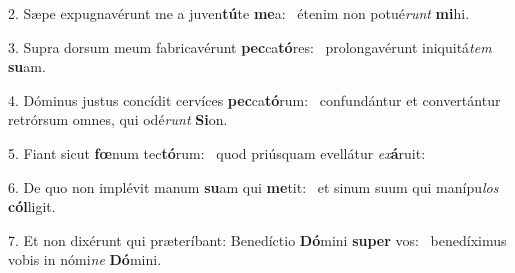 2. Sæpe expugnavérunt me a juven\textbf{tú}te \textbf{me}a: \ast\  étenim non potué\textit{runt} \textbf{mi}hi.\

3. Supra dorsum meum fabricavérunt \textbf{pec}ca\textbf{tó}res: \ast\  prolongavérunt iniquitá\textit{tem} \textbf{su}am.\

4. Dóminus justus concídit cervíces \textbf{pec}ca\textbf{tó}rum: \ast\  confundántur et convertántur retrórsum omnes, qui odé\textit{runt} \textbf{Si}on.\

5. Fiant sicut \textbf{fœ}num tec\textbf{tó}rum: \ast\  quod priúsquam evellátur \textit{ex}\textbf{á}ruit:\

6. De quo non implévit manum \textbf{su}am qui \textbf{me}tit: \ast\  et sinum suum qui manípu\textit{los} \textbf{cól}ligit.\

7. Et non dixérunt qui præteríbant: Benedíctio \textbf{Dó}mini \textbf{su}\textbf{per} vos: \ast\  benedíximus vobis in nómi\textit{ne} \textbf{Dó}mini.\

